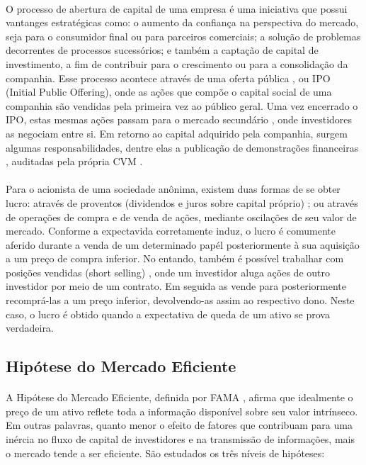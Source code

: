 \paragraph{} O processo de abertura de capital de uma empresa é uma iniciativa que possui vantanges estratégicas \cite{vantagens_sa} como: o aumento da confiança na perspectiva do mercado, seja para o consumidor final ou para parceiros comerciais; a solução de problemas decorrentes de processos sucessórios; e também a captação de capital de investimento, a fim de contribuir para o crescimento ou para a consolidação da companhia. Esse processo acontece através de uma oferta pública \cite{oferta_publica}, ou IPO (Initial Public Offering), onde as ações que compõe o capital social \cite{capital_social} de uma companhia são vendidas pela primeira vez ao público geral. Uma vez encerrado o IPO, estas mesmas ações passam para o mercado secundário \cite{mercado_secundario}, onde investidores as negociam entre si. Em retorno ao capital adquirido pela companhia, surgem algumas responsabilidades, dentre elas a publicação de demonstrações financeiras \cite{dem_finan}, auditadas pela própria CVM \cite{audi_dem_finan}.

\paragraph{} Para o acionista de uma sociedade anônima, existem duas formas de se obter lucro: através de proventos (dividendos e juros sobre capital próprio) \cite{proventos}; ou através de operações de compra e de venda de ações, mediante oscilações de seu valor de mercado. Conforme a expectavida corretamente induz, o lucro é comumente aferido durante a venda de um determinado papél posteriormente à sua aquisição a um preço de compra inferior. No entando, também é possível trabalhar com posições vendidas (short selling) \cite{short_selling}, onde um investidor aluga ações de outro investidor por meio de um contrato. Em seguida as vende para posteriormente recomprá-las a um preço inferior, devolvendo-as assim ao respectivo dono. Neste caso, o lucro é obtido quando a expectativa de queda de um ativo se prova verdadeira.



\subsection{Hipótese do Mercado Eficiente}

\paragraph{} A Hipótese do Mercado Eficiente, definida por FAMA \cite{fama1970efficient}, afirma que idealmente o preço de um ativo reflete toda a informação disponível sobre seu valor intrínseco. Em outras palavras, quanto menor o efeito de fatores que contribuam para uma inércia no fluxo de capital de investidores e na transmissão de informações, mais o mercado tende a ser eficiente. São estudados os três níveis de hipóteses:

